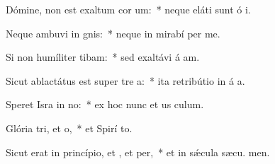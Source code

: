 \item Dómine, non est exaltum cor um:~* neque eláti sunt ó i.
\item Neque ambuvi in gnis:~* neque in mirabí per me.
\item Si non humíliter tibam:~* sed exaltávi á am.
\item Sicut ablactátus est super tre a:~* ita retribútio in á a.
\item Speret Isra in no:~* ex hoc nunc et us  culum.
\item Glória tri, et o,~* et Spirí to.
\item Sicut erat in princípio, et , et per,~* et in sǽcula sæcu. men.
